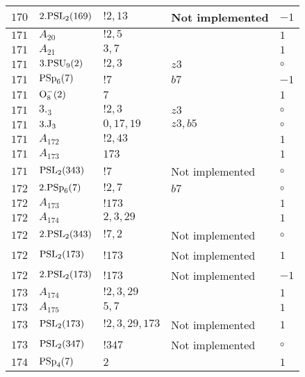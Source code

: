 \documentclass[a4paper, 11pt]{article}
\begin{document}
\begin{longtable}{lllll}
        $ 170 $ & $ 2.{\rm PSL}_{2}(169) $ & $ !2, 13 $ &  Not implemented & $ -1$ \\ \hline
        $ 171 $ & $ A_{20} $ & $ ! 2,5 $ & $ ~ $ & $ 1$ \\ \hline
        $ 171 $ & $ A_{21} $ & $ 3,7 $ & $ ~ $ & $ 1$ \\ \hline
        $ 171 $ & $ 3.{\rm PSU}_{9}(2) $ & $ ! 2,3 $ & $ z3 $ &  $\circ$ \\ \hline
        $ 171 $ & $ {\rm PSp}_{6}(7) $ & $ ! 7 $ & $ b7 $ & $ -1$ \\ \hline
        $ 171 $ & $ {\rm O}_{8}^-(2) $ & $ 7 $ & $ ~ $ & $ 1$ \\ \hline
        $ 171 $ & $ 3._{3} $ & $ ! 2,3 $ & $ z3 $ &  $\circ$ \\ \hline
        $ 171 $ & $ 3.{\rm J}_3 $ & $ 0,17,19 $ & $ z3, b5 $ &  $\circ$ \\ \hline
        $ 171 $ & $ A_{172} $ & $ !2, 43 $ & $ ~ $ & $ 1$ \\ \hline
        $ 171 $ & $ A_{173} $ & $ 173 $ & $ ~ $ & $ 1$ \\ \hline
        $ 171 $ & $ {\rm PSL}_{2}(343) $ & $ !7 $ &  Not implemented &  $\circ$ \\ \hline
        $ 172 $ & $ 2.{\rm PSp}_{6}(7) $ & $ ! 2,7 $ & $ b7 $ &  $\circ$ \\ \hline
        $ 172 $ & $ A_{173} $ & $ !173 $ & $ ~ $ & $ 1$ \\ \hline
        $ 172 $ & $ A_{174} $ & $ 2, 3, 29 $ & $ ~ $ & $ 1$ \\ \hline
        $ 172 $ & $ 2.{\rm PSL}_{2}(343) $ & $ !7, 2 $ &  Not implemented &  $\circ$ \\ \hline
        $ 172 $ & $ {\rm PSL}_{2}(173) $ & $ !173 $ &  Not implemented & $ 1$ \\ \hline
        $ 172 $ & $ 2.{\rm PSL}_{2}(173) $ & $ !173 $ &  Not implemented & $ -1$ \\ \hline
        $ 173 $ & $ A_{174} $ & $ !2, 3, 29 $ & $ ~ $ & $ 1$ \\ \hline
        $ 173 $ & $ A_{175} $ & $ 5, 7 $ & $ ~ $ & $ 1$ \\ \hline
        $ 173 $ & $ {\rm PSL}_{2}(173) $ & $ !2, 3, 29, 173 $ &  Not implemented & $ 1$ \\ \hline
        $ 173 $ & $ {\rm PSL}_{2}(347) $ & $ !347 $ &  Not implemented &  $\circ$ \\ \hline
        $ 174 $ & $ {\rm PSp}_{4}(7) $ & $ 2 $ & $ ~ $ & $ 1$ \\ \hline

\end{longtable}
\end{document}
